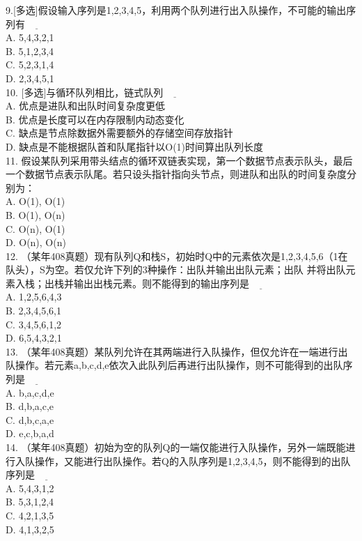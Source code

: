     9.[多选]假设输入序列是1,2,3,4,5，利用两个队列进行出入队操作，不可能的输出序列有$\underline{\hspace{1cm}}$\\
A. 5,4,3,2,1\\
B. 5,1,2,3,4\\
C. 5,2,3,1,4\\
D. 2,3,4,5,1\\

    10. [多选]与循环队列相比，链式队列$\underline{\hspace{1cm}}$\\
A. 优点是进队和出队时间复杂度更低\\
B. 优点是长度可以在内存限制内动态变化\\
C. 缺点是节点除数据外需要额外的存储空间存放指针\\
D. 缺点是不能根据队首和队尾指针以O(1)时间算出队列长度\\

    11. 假设某队列采用带头结点的循环双链表实现，第一个数据节点表示队头，最后一个数据节点表示队尾。若只设头指针指向头节点，则进队和出队的时间复杂度分别为：\\
A. O(1), O(1) \\
B. O(1), O(n)\\
C. O(n), O(1)\\
D. O(n), O(n)\\

    12. （某年408真题）现有队列Q和栈S，初始时Q中的元素依次是1,2,3,4,5,6（1在队头），S为空。若仅允许下列的3种操作：出队并输出出队元素；出队
    并将出队元素入栈；出栈并输出出栈元素。则不能得到的输出序列是$\underline{\hspace{1cm}}$\\
A. 1,2,5,6,4,3\\
B. 2,3,4,5,6,1\\
C. 3,4,5,6,1,2\\
D. 6,5,4,3,2,1\\

    13. （某年408真题）某队列允许在其两端进行入队操作，但仅允许在一端进行出队操作。若元素a,b,c,d,e依次入此队列后再进行出队操作，则不可能得到的出队序列是$\underline{\hspace{1cm}}$\\
A. b,a,c,d,e\\
B. d,b,a,c,e\\
C. d,b,c,a,e\\
D. e,c,b,a,d\\

    14. （某年408真题）初始为空的队列Q的一端仅能进行入队操作，另外一端既能进行入队操作，又能进行出队操作。若Q的入队序列是1,2,3,4,5，则不能得到的出队序列是$\underline{\hspace{1cm}}$\\
A. 5,4,3,1,2\\
B. 5,3,1,2,4\\
C. 4,2,1,3,5\\
D. 4,1,3,2,5\\

